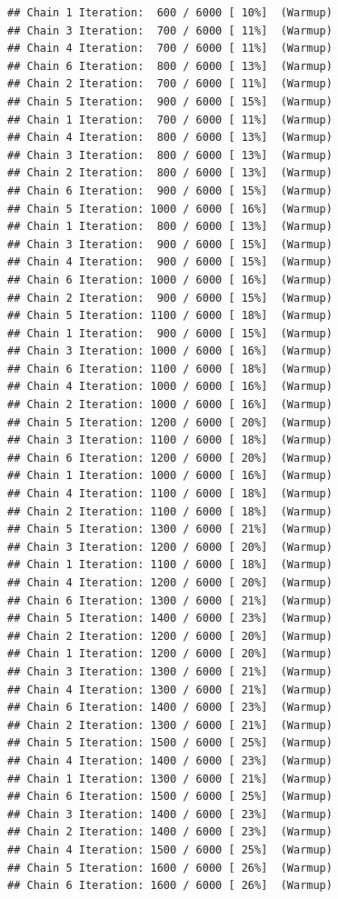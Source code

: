 \documentclass[
]{article}
\begin{document}
\begin{verbatim}
## Chain 1 Iteration:  600 / 6000 [ 10%]  (Warmup) 
## Chain 3 Iteration:  700 / 6000 [ 11%]  (Warmup) 
## Chain 4 Iteration:  700 / 6000 [ 11%]  (Warmup) 
## Chain 6 Iteration:  800 / 6000 [ 13%]  (Warmup) 
## Chain 2 Iteration:  700 / 6000 [ 11%]  (Warmup) 
## Chain 5 Iteration:  900 / 6000 [ 15%]  (Warmup) 
## Chain 1 Iteration:  700 / 6000 [ 11%]  (Warmup) 
## Chain 4 Iteration:  800 / 6000 [ 13%]  (Warmup) 
## Chain 3 Iteration:  800 / 6000 [ 13%]  (Warmup) 
## Chain 2 Iteration:  800 / 6000 [ 13%]  (Warmup) 
## Chain 6 Iteration:  900 / 6000 [ 15%]  (Warmup) 
## Chain 5 Iteration: 1000 / 6000 [ 16%]  (Warmup) 
## Chain 1 Iteration:  800 / 6000 [ 13%]  (Warmup) 
## Chain 3 Iteration:  900 / 6000 [ 15%]  (Warmup) 
## Chain 4 Iteration:  900 / 6000 [ 15%]  (Warmup) 
## Chain 6 Iteration: 1000 / 6000 [ 16%]  (Warmup) 
## Chain 2 Iteration:  900 / 6000 [ 15%]  (Warmup) 
## Chain 5 Iteration: 1100 / 6000 [ 18%]  (Warmup) 
## Chain 1 Iteration:  900 / 6000 [ 15%]  (Warmup) 
## Chain 3 Iteration: 1000 / 6000 [ 16%]  (Warmup) 
## Chain 6 Iteration: 1100 / 6000 [ 18%]  (Warmup) 
## Chain 4 Iteration: 1000 / 6000 [ 16%]  (Warmup) 
## Chain 2 Iteration: 1000 / 6000 [ 16%]  (Warmup) 
## Chain 5 Iteration: 1200 / 6000 [ 20%]  (Warmup) 
## Chain 3 Iteration: 1100 / 6000 [ 18%]  (Warmup) 
## Chain 6 Iteration: 1200 / 6000 [ 20%]  (Warmup) 
## Chain 1 Iteration: 1000 / 6000 [ 16%]  (Warmup) 
## Chain 4 Iteration: 1100 / 6000 [ 18%]  (Warmup) 
## Chain 2 Iteration: 1100 / 6000 [ 18%]  (Warmup) 
## Chain 5 Iteration: 1300 / 6000 [ 21%]  (Warmup) 
## Chain 3 Iteration: 1200 / 6000 [ 20%]  (Warmup) 
## Chain 1 Iteration: 1100 / 6000 [ 18%]  (Warmup) 
## Chain 4 Iteration: 1200 / 6000 [ 20%]  (Warmup) 
## Chain 6 Iteration: 1300 / 6000 [ 21%]  (Warmup) 
## Chain 5 Iteration: 1400 / 6000 [ 23%]  (Warmup) 
## Chain 2 Iteration: 1200 / 6000 [ 20%]  (Warmup) 
## Chain 1 Iteration: 1200 / 6000 [ 20%]  (Warmup) 
## Chain 3 Iteration: 1300 / 6000 [ 21%]  (Warmup) 
## Chain 4 Iteration: 1300 / 6000 [ 21%]  (Warmup) 
## Chain 6 Iteration: 1400 / 6000 [ 23%]  (Warmup) 
## Chain 2 Iteration: 1300 / 6000 [ 21%]  (Warmup) 
## Chain 5 Iteration: 1500 / 6000 [ 25%]  (Warmup) 
## Chain 4 Iteration: 1400 / 6000 [ 23%]  (Warmup) 
## Chain 1 Iteration: 1300 / 6000 [ 21%]  (Warmup) 
## Chain 6 Iteration: 1500 / 6000 [ 25%]  (Warmup) 
## Chain 3 Iteration: 1400 / 6000 [ 23%]  (Warmup) 
## Chain 2 Iteration: 1400 / 6000 [ 23%]  (Warmup) 
## Chain 4 Iteration: 1500 / 6000 [ 25%]  (Warmup) 
## Chain 5 Iteration: 1600 / 6000 [ 26%]  (Warmup) 
## Chain 6 Iteration: 1600 / 6000 [ 26%]  (Warmup) 

\end{verbatim}
\end{document}
